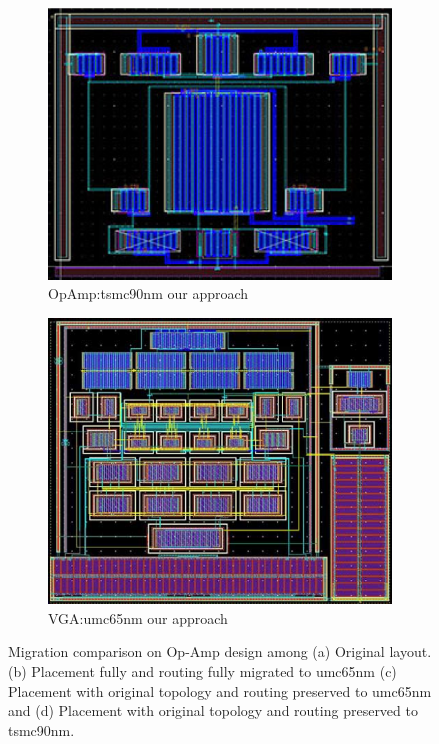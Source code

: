 \begin{figure}[ht]
\begin{subfigure}[t]{0.4\textwidth}
          \includegraphics[width=\textwidth]{Fig/PPL_OPT90.eps}
          \caption{OpAmp:tsmc90nm our approach}\label{fig:PPL_OPT90}
          \end{subfigure}
          \begin{subfigure}[t]{0.4\textwidth}
          \includegraphics[width=\textwidth]{Fig/PPL_VGAU65.eps}
          \caption{VGA:umc65nm our approach}\label{fig:PPL_VGAU65}
          \end{subfigure}
        \caption{Migration comparison on Op-Amp design among (a) Original layout. (b) Placement fully and routing fully migrated to umc65nm (c) Placement with original topology and routing preserved to umc65nm and (d) Placement with original topology and routing preserved to tsmc90nm.}\label{fig:Layout}
      \end{figure}



